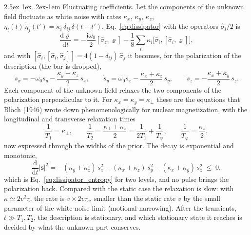 \documentclass[10pt,a4paper]{article}
\makeatletter
\renewcommand{\paragraph}{\@startsection{paragraph}{4}{\z@}%
  {2.5ex \@plus 1ex \@minus .2ex}{-1em}%
  {\normalfont\fontsize{14pt}{17pt}\selectfont\bfseries}}
\newcommand{\dd}{\mathrm{d}}
\newcommand{\ii}{\mathrm{i}}
\makeatother
\begin{document}
\paragraph{Fluctuating coefficients.}
Let the components of the unknown field fluctuate as white noise with rates $ \kappa_x $, $ \kappa_y $, $ \kappa_z $, $ \overline{\eta_i(t)\,\eta_j(t')} = \kappa_i\,\delta_{ij}\,\delta(t - t') $.
Eq.~\eqref{eq:dissipator} with the operators $ \hat\sigma_i/2 $ is
\[
  \frac{\dd\varrho}{\dd t} = -\frac{\ii\omega_0}{2}[\hat\sigma_z, \varrho]
  - \frac18\sum_i\kappa_i\big[\hat\sigma_i, [\hat\sigma_i, \varrho]\big] ,
\]
and with $ [\hat\sigma_i, [\hat\sigma_i, \hat\sigma_j]] = 4(1 - \delta_{ij})\,\hat\sigma_j $ it becomes, for the polarization of the description (the bar is dropped),
\begin{equation}\label{eq:bloch}
  \dot s_x = -\omega_0s_y - \frac{\kappa_y + \kappa_z}{2}\,s_x , \qquad
  \dot s_y = \omega_0s_x - \frac{\kappa_x + \kappa_z}{2}\,s_y , \qquad
  \dot s_z = -\frac{\kappa_x + \kappa_y}{2}\,s_z .
\end{equation}
Each component of the unknown field relaxes the two components of the polarization perpendicular to it.
For $ \kappa_x = \kappa_y = \kappa_\perp $ these are the equations that Bloch (1946) wrote down phenomenologically for nuclear magnetization, with the longitudinal and transverse relaxation times
\[
  \frac{1}{T_1} = \kappa_\perp , \qquad
  \frac{1}{T_2} = \frac{\kappa_\perp + \kappa_z}{2} = \frac{1}{2T_1} + \frac{1}{T_\varphi} ,
  \qquad \frac{1}{T_\varphi} = \frac{\kappa_z}{2} ,
\]
now expressed through the widths of the prior.
The decay is exponential and monotonic,
\[
  \frac{\dd}{\dd t}|\mathbf{s}|^{2} = -(\kappa_y + \kappa_z)\,s_x^{2} - (\kappa_x + \kappa_z)\,s_y^{2}
  - (\kappa_x + \kappa_y)\,s_z^{2} \;\leq\; 0 ,
\]
which is Eq.~\eqref{eq:dissipator_entropy} for two levels, and no pulse brings the polarization back.
Compared with the static case the relaxation is slow: with $ \kappa \simeq 2v^{2}\tau_c $ the rate is $ v\times 2v\tau_c $, smaller than the static rate $ v $ by the small parameter of the white-noise limit (motional narrowing).
After the transients, $ t \gg T_1, T_2 $, the description is stationary, and which stationary state it reaches is decided by what the unknown part conserves.
\end{document}

